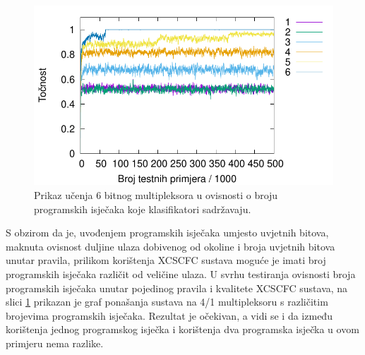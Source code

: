 \documentclass[times, utf8, zavrsni]{fer}
\begin{document}
\begin{figure}[!h]
    \centering
    \includegraphics[width=12cm]{img/mux_cond/6bitcond.pdf}
    \caption{Prikaz učenja 6 bitnog multipleksora u ovisnosti o broju programskih isječaka koje klasifikatori sadržavaju.}
    \label{img:6bitcond}
\end{figure}
S obzirom da je, uvođenjem programskih isječaka umjesto uvjetnih bitova, maknuta ovisnost duljine ulaza dobivenog od okoline i broja uvjetnih bitova unutar pravila, prilikom korištenja XCSCFC sustava moguće je imati broj programskih isječaka različit od veličine ulaza.
U svrhu testiranja ovisnosti broja programskih isječaka unutar pojedinog pravila i kvalitete XCSCFC sustava, na slici \ref{img:6bitcond} prikazan je graf ponašanja sustava na 4/1 multipleksoru s različitim brojevima programskih isječaka.
Rezultat je očekivan, a vidi se i da između korištenja jednog programskog isječka i korištenja dva programska isječka u ovom primjeru nema razlike.
\end{document}
